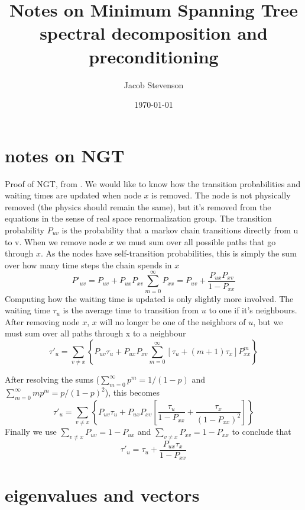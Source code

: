 \documentclass[a4paper]{article}
\title{Notes on Minimum Spanning Tree spectral decomposition and preconditioning}
\author{Jacob Stevenson}
\date{\today}
\begin{document}
\maketitle

\section{notes on NGT}
Proof of NGT, from \cite{wales.2009}.  We would like to know how the transition probabilities and waiting times
are updated when node $x$ is removed.  The node is not physically removed (the physics should remain the same), but it's
removed from the equations in the sense of real space renormalization group.  
The transition probability $P_{uv}$ is the probability that a markov chain 
transitions directly from u to v.  When we remove node $x$ we must sum over all possible paths that go through $x$.
As the nodes have self-transition probabilities, this is simply the sum over how many time steps the chain spends in $x$
\begin{equation}
P'_{uv} = P_{uv} + P_{ux} P_{xv} \sum_{m=0}^{\infty} P_{xx} = P_{uv} + \frac{ P_{ux} P_{xv} }{ 1 - P_{xx} }
\end{equation}
Computing how the waiting time is updated is only slightly more involved.  The waiting time $\tau_u$ is the average time to transition
from $u$ to one if it's neighbours.  After removing node $x$, $x$ will no longer be one of the neighbors of $u$, but we must sum
over all paths through x to a neighbour
\begin{equation}
\tau'_u = \sum_{v \ne x} \left\{ 
P_{uv} \tau_u + P_{ux} P_{xv}
\sum_{m=0}^{\infty} \left[ \tau_u + (m+1) \tau_x \right] P_{xx}^{m}
\right\}
\end{equation}

After resolving the sums ($\sum_{m=0}^{\infty} p^m = 1/(1-p)$ and $\sum_{m=0}^{\infty} m p^m = p/(1-p)^2$), this becomes
\begin{equation}
\tau'_u = \sum_{v \ne x} \left\{ 
P_{uv} \tau_u + P_{ux} P_{xv} \left[ 
\frac{\tau_u}{1-P_{xx}} + \frac{\tau_x}{(1-P_{xx})^2}
\right]
\right\}
\end{equation}
Finally we use $\sum_{v\ne x} P_{uv} = 1-P_{ux}$ and $\sum_{v\ne x} P_{xv} = 1-P_{xx}$ to conclude that
\begin{equation}
\tau'_u = \tau_u + \frac{ P_{ux} \tau_x}{1-P_{xx}}
\end{equation}


\section{eigenvalues and vectors}
\end{document}
